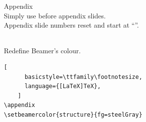\documentclass[aspectratio=169,12pt]{beamer}
\begin{document}
\begin{frame}[fragile]{Appendix}
  \\
  Simply use  before appendix slides.\\
  Appendix slide numbers reset and start at ``''.

  \medskip
  \\
  Redefine Beamer's  colour.

  \medskip
  \begin{lstlisting}[
      basicstyle=\ttfamily\footnotesize,
      language={[LaTeX]TeX},
    ]
\appendix
\setbeamercolor{structure}{fg=steelGray}
  \end{lstlisting}

\end{frame}
\end{document}

